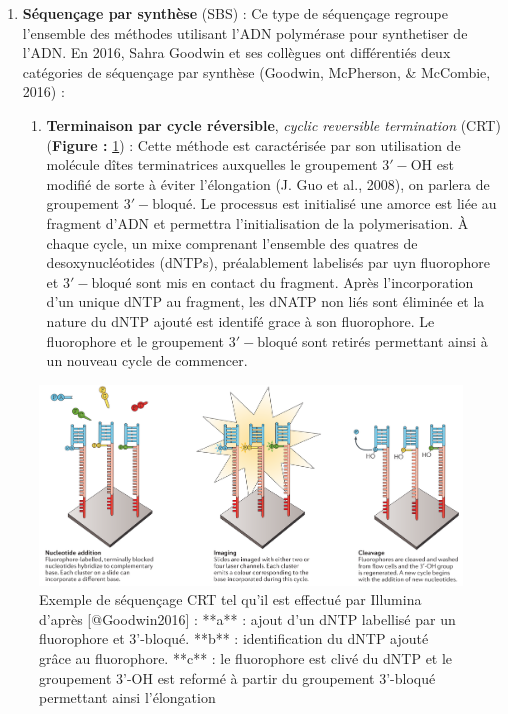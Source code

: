 \documentclass[12pt,twoside]{reedthesis}
\providecommand{\tightlist}{%
  \setlength{\itemsep}{0pt}\setlength{\parskip}{0pt}}
\theoremstyle{definition}
\theoremstyle{definition}
\theoremstyle{remark}
\begin{document}
  \begin{enumerate}
  \def\labelenumi{\arabic{enumi}.}
  \tightlist
  \item
    \textbf{Séquençage par synthèse} (SBS) : Ce type de séquençage
    regroupe l'ensemble des méthodes utilisant l'ADN polymérase pour
    synthetiser de l'ADN. En 2016, Sahra Goodwin et ses collègues ont
    différentiés deux catégories de séquençage par synthèse (Goodwin,
    McPherson, \& McCombie, 2016) :
  
    \begin{enumerate}
    \def\labelenumii{\alph{enumii}.}
    \tightlist
    \item
      \textbf{Terminaison par cycle réversible}, \emph{cyclic reversible
      termination} (CRT) (\textbf{Figure : }\ref{fig:crtSeq}) : Cette
      méthode est caractérisée par son utilisation de molécule dîtes
      terminatrices auxquelles le groupement \(\mathrm{3'-OH}\) est
      modifié de sorte à éviter l'élongation (J. Guo et al., 2008), on
      parlera de groupement \(\mathrm{3'-bloqué}\). Le processus est
      initialisé une amorce est liée au fragment d'ADN et permettra
      l'initialisation de la polymerisation. À chaque cycle, un mixe
      comprenant l'ensemble des quatres de desoxynucléotides (dNTPs),
      préalablement labelisés par uyn fluorophore et
      \(\mathrm{3'-bloqué}\) sont mis en contact du fragment. Après
      l'incorporation d'un unique dNTP au fragment, les dNATP non liés
      sont éliminée et la nature du dNTP ajouté est identifé grace à son
      fluorophore. Le fluorophore et le groupement \(\mathrm{3'-bloqué}\)
      sont retirés permettant ainsi à un nouveau cycle de commencer.
    \end{enumerate}
  \end{enumerate}
  
  \begin{figure}
  
  {\centering \includegraphics[scale=.28]{figure/CRT_seq_illumina} 
  
  }
  
  \caption[Exemple de séquençage CRT tel qu'il est effectué par Illumina]{Exemple de séquençage CRT tel qu'il est effectué par Illumina d'après [@Goodwin2016] : **a** : ajout d'un dNTP labellisé par un fluorophore et 3'-bloqué. **b** : identification du dNTP ajouté grâce au fluorophore. **c** : le fluorophore est clivé du dNTP et le groupement 3'-OH est reformé à partir du groupement 3'-bloqué permettant ainsi l'élongation}\label{fig:crtSeq}
  \end{figure}
  
\end{document}
